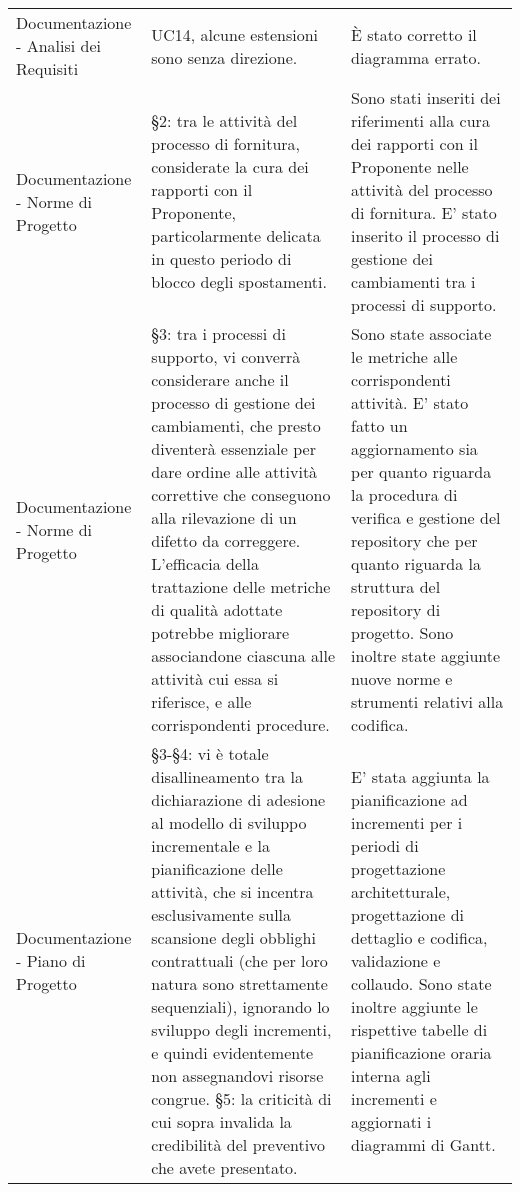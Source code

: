 \begin{longtable}{ 
				>{\centering}p{} 
				>{\centering}p{}
				>{\centering\arraybackslash}p{}}
				Documentazione - Analisi dei Requisiti
					&
				UC14, alcune estensioni sono senza direzione.
					&
				È stato corretto il diagramma errato. 
					\\
			
		 
				Documentazione - Norme di Progetto
					&
				 §2: tra le attività del processo di fornitura, considerate la cura dei rapporti con il Proponente\ped{\textit{G}}, particolarmente delicata in questo periodo di blocco degli spostamenti.
					&
				Sono stati inseriti dei riferimenti alla cura dei rapporti con il Proponente\ped{\textit{G}} nelle attività del processo di fornitura. E' stato inserito il processo di gestione dei cambiamenti tra i processi di supporto.
					\\
			
				Documentazione - Norme di Progetto
					&
				 §3: tra i processi di supporto, vi converrà considerare anche il processo di gestione dei cambiamenti, che presto diventerà essenziale per dare ordine alle attività correttive che conseguono alla rilevazione di un difetto da correggere. L'efficacia della trattazione delle metriche di qualità adottate potrebbe migliorare associandone ciascuna alle attività cui essa si riferisce, e alle corrispondenti procedure.
					&
				Sono state associate le metriche alle corrispondenti attività.
				E' stato fatto un aggiornamento sia per quanto riguarda la procedura di verifica e gestione del repository\ped{\textit{G}} che per quanto riguarda la struttura del repository\ped{\textit{G}} di progetto. Sono inoltre state aggiunte nuove norme e strumenti relativi alla codifica.
					\\
			 
				Documentazione - Piano di Progetto
					&
				§3-§4: vi è totale disallineamento tra la dichiarazione di adesione al modello di sviluppo incrementale e la pianificazione delle attività, che si incentra esclusivamente sulla scansione degli obblighi contrattuali (che per loro natura sono strettamente sequenziali), ignorando lo sviluppo degli incrementi, e quindi evidentemente non assegnandovi risorse congrue. §5: la criticità di cui sopra invalida la credibilità del preventivo che avete presentato.
					&
				E' stata aggiunta la pianificazione ad incrementi per i periodi di progettazione architetturale, progettazione di dettaglio e codifica, validazione e collaudo. Sono state inoltre aggiunte le rispettive tabelle di pianificazione oraria interna agli incrementi e aggiornati i diagrammi di Gantt.
					\\
			

\end{longtable}
